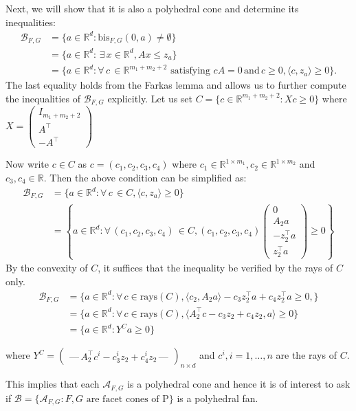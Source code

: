 \documentclass[11pt, amsfonts, reqno]{amsart}
\theoremstyle{plain}
\theoremstyle{definition}
\theoremstyle{remark}
\newcommand\inner[2]{\langle {#1},{#2}\rangle}
\newcommand{\bis}{\text{bis}}
\begin{document}
Next, we will show that it is also a polyhedral cone and determine its inequalities:
\begin{align*}
    \mathcal{B}_{F, G} &= \{a \in \mathbb{R}^{d}: \bis_{F, G}(0, a) \neq \emptyset\} \\&= \{a \in \mathbb{R}^{d}: \, \exists \, x \in \mathbb{R}^{d}, Ax \leq z_{a}\} \\& = \{a \in \mathbb{R}^{d}: \forall \, c \, \in \mathbb{R}^{m_{1}+m_{2}+2} \, \, \text{satisfying} \, \, cA = 0 \, \text{and} \, c \geq 0, \inner{c}{z_{a}} \geq 0\}.
\end{align*}
The last equality holds from the Farkas lemma \cite{Ziegler} and allows us to further compute the inequalities of $\mathcal{B}_{F, G}$ explicitly. Let us set $C = \{c \in \mathbb{R}^{m_{1}+m_{2}+2}: Xc \geq 0\}$ where $X = \begin{pmatrix}I_{m_{1}+m_{2} +2} \\ A^{\top} \\-A^{\top} \end{pmatrix}$

Now write $c \in C$ as $c = (c_{1}, c_{2}, c_{3}, c_{4})$ where $c_{1} \in \mathbb{R}^{1 \times m_{1}}, c_{2} \in \mathbb{R}^{1 \times m_{2}}$ and $c_{3}, c_{4} \in \mathbb{R}.$ Then the above condition can be simplified as:
\begin{align*}
\mathcal{B}_{F, G} &= \{a \in \mathbb{R}^{d}: \forall \, c \, \in C, \inner{c}{z_{a}}\geq 0 \} \\&= \left \{a \in \mathbb{R}^{d}: \forall \, (c_{1}, c_{2}, c_{3}, c_{4}) \, \in C, (c_{1}, c_{2}, c_{3}, c_{4})\begin{pmatrix} 0 \\ A_{2}a \\ -z_{2}^{\top}a \\ z_{2}^{\top}a 
\end{pmatrix} \geq 0\right\}
\end{align*}
By the convexity of $C$, it suffices that the inequality be verified by the rays of $C$ only.
\begin{align*}
\mathcal{B}_{F, G} &= \{a \in \mathbb{R}^{d}: \forall \, c \in \text{rays}(C),  \inner{c_{2}}{A_{2}a} -c_{3}z_{2}^{\top}a + c_{4}z_{2}^{\top}a \geq 0, \} \\&= \{a \in \mathbb{R}^{d}: \forall \, c \in \text{rays}(C), \inner{A_{2}^{\top}c - c_{3}z_{2}+c_{4}z_{2}}{a} \geq 0\} \\&= \{a \in \mathbb{R}^{d}: Y^{C}a \geq 0\} 
\end{align*}

where $Y^{C} = \begin{pmatrix} \mbox{---} \,  A_{2}^{\top}c^{i} - c_{3}^{i}z_{2}+c_{4}^{i}z_{2} \, \mbox{---}  \end{pmatrix}_{n \times d}$ and $c^{i}, i=1, \ldots, n$ are the rays of $C.$

This implies that each $\mathcal{A}_{F, G}$ is a polyhedral cone and hence it is of interest to ask if $\mathcal{B} = \{\mathcal{A}_{F, G}: F, G\, \, \text{are facet cones of P}\}$ is a polyhedral fan.



\end{document}

